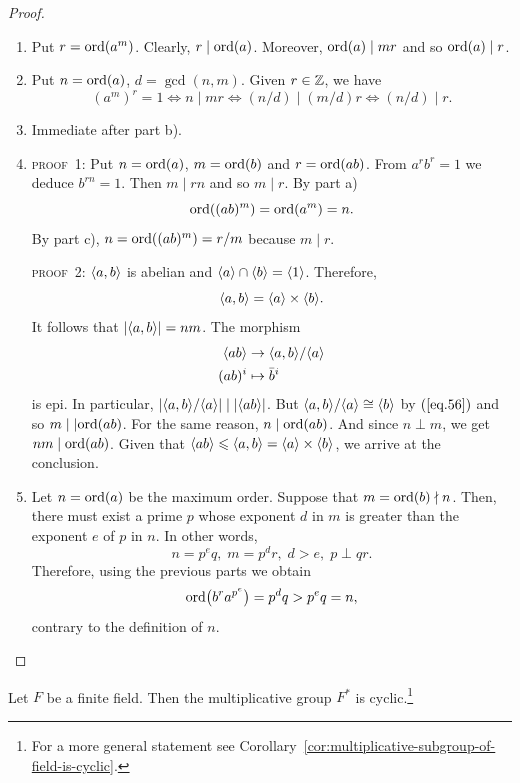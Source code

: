 \begin{proof}${}$
\begin{enumerate}[\upshape a)]
    \item Put $r={\rm ord}(a^m)$. Clearly, $r\mid{\rm ord}(a)$. Moreover, ${\rm ord}(a)\mid mr$ and so ${\rm ord}(a)\mid r$.
    
    \item Put $n={\rm ord}(a)$, $d=\gcd(n,m)$. Given $r\in\mathbb{Z}$, we have
    $$
        (a^m)^r=1\iff n\mid mr\iff (n/d)\mid (m/d)r
            \iff (n/d)\mid r.
    $$
    
    \item Immediate after part b).

    \item \textsc{proof~1:} Put $n={\rm ord}(a)$, $m={\rm ord}(b)$ and $r={\rm ord}(ab)$. From $a^rb^r=1$ we deduce $b^{rn}=1$. Then $m\mid rn$ and so $m\mid r$. By part a)
    $$
        {\rm ord}((ab)^m)={\rm ord}(a^m)=n.
    $$
    By part c), $n={\rm ord}((ab)^m)=r/m$ because $m\mid r$.

    \textsc{proof~2:} $\langle a,b\rangle$ is abelian and $\langle a\rangle\cap\langle b\rangle=\langle1\rangle$. Therefore,
    \begin{equation}\label{eq.56}
        \langle a,b\rangle=\langle a\rangle\times\langle b\rangle.
    \end{equation}
    It follows that $|\langle a,b\rangle|=nm$. The morphism
    \begin{align*}
        \langle ab\rangle&\to\langle a,b\rangle/\langle a\rangle\\
        (ab)^i&\mapsto \bar b^i
    \end{align*}
    is epi. In particular, $|\langle a,b\rangle/\langle a\rangle|\mid|\langle ab\rangle|$. But $\langle a,b\rangle/\langle a\rangle\cong\langle b\rangle$ by $(\ref{eq.56})$ and so $m\mid|{\rm ord}(ab)$. For the same reason, $n\mid{\rm ord}(ab)$. And since $n\perp m$, we get $nm\mid{\rm ord}(ab)$. Given that $\langle ab\rangle\leqslant\langle a,b\rangle=\langle a\rangle\times\langle b\rangle$, we arrive at the conclusion.
    
    \item Let $n={\rm ord}(a)$ be the maximum order. Suppose that $m={\rm ord}(b)\nmid n$. Then, there must exist a prime $p$ whose exponent $d$ in $m$ is greater than the exponent $e$ of $p$ in $n$. In other words,
    $$
        n=p^eq,\; m=p^dr,\; d>e,\; p\perp qr.
    $$
    Therefore, using the previous parts we obtain
    $$
        {\rm ord}\big(b^ra^{p^e}\big)=p^dq> p^eq=n,
    $$
    contrary to the definition of $n$.
\end{enumerate}
\end{proof}

\begin{prop}
    Let\/ $F$ be a finite field. Then the multiplicative group $F^*$ is cyclic.\footnote{For a more general statement see Corollary~\ref{cor:multiplicative-subgroup-of-field-is-cyclic}.}
\end{prop}

